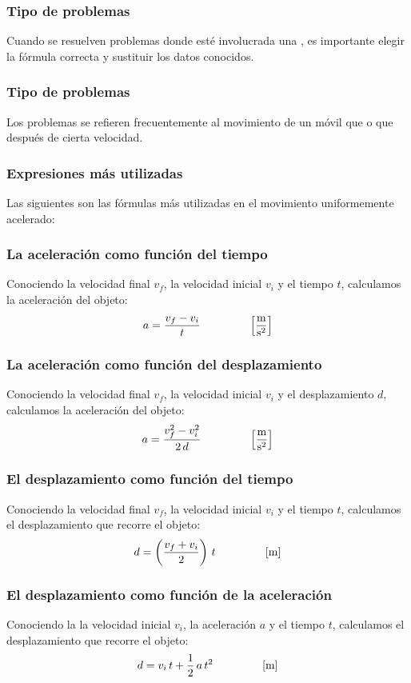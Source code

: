 \documentclass[14pt]{beamer}
\begin{document}
\begin{frame}
\frametitle{Tipo de problemas}
Cuando se resuelven problemas donde esté involucrada una , \pause es importante elegir la fórmula correcta y sustituir los datos conocidos.
\end{frame}
\begin{frame}
\frametitle{Tipo de problemas}
Los problemas se refieren frecuentemente al movimiento de un móvil que  o que  después de cierta velocidad.
\end{frame}
\begin{frame}
\frametitle{Expresiones más utilizadas}
Las siguientes son las fórmulas más utilizadas en el movimiento uniformemente acelerado:
\end{frame}
\begin{frame}
\frametitle{La aceleración como función del tiempo}
Conociendo la velocidad final $v_{f}$, la velocidad inicial $v_{i}$ y el tiempo $t$, calculamos la aceleración del objeto:
\pause
\begin{align*}
a = \dfrac{v_{f} - v_{i}}{t} \hspace*{1.5cm} \left[ \dfrac{\unit{\meter}}{\unit{\square\second}} \right]
\end{align*}
\end{frame}
\begin{frame}
\frametitle{La aceleración como función del desplazamiento}
Conociendo la velocidad final $v_{f}$, la velocidad inicial $v_{i}$ y el desplazamiento $d$, calculamos la aceleración del objeto:
\pause
\begin{align*}
a = \dfrac{v_{f}^{2} - v_{i}^{2}}{2 \, d} \hspace*{1.5cm} \left[ \dfrac{\unit{\meter}}{\unit{\square\second}} \right]
\end{align*}
\end{frame}
\begin{frame}
\frametitle{El desplazamiento como función del tiempo}
Conociendo la velocidad final $v_{f}$, la velocidad inicial $v_{i}$ y el tiempo $t$, calculamos el desplazamiento que recorre el objeto:
\pause
\begin{align*}
d = \left( \dfrac{v_{f} + v_{i}}{2} \right) \, t \hspace*{1.5cm} \left[ \unit{\meter} \right]
\end{align*}
\end{frame}
\begin{frame}
\frametitle{El desplazamiento como función de la aceleración}
Conociendo la la velocidad inicial $v_{i}$, la aceleración $a$ y el tiempo $t$, calculamos el desplazamiento que recorre el objeto:
\pause
\begin{align*}
d = v_{i} \, t + \dfrac{1}{2} \, a \, t^{2} \hspace*{1.5cm} \left[ \unit{\meter} \right]
\end{align*}
\end{frame}
\end{document}
